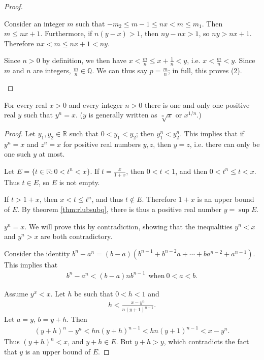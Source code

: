 \documentclass[12pt]{article}
\begin{document}
\begin{thm}
\begin{proof}
\begin{enumerate}
        Consider an integer $m$ such that $-m_2 \leq m - 1 \leq nx < m \leq m_1$.
        Then $m \leq nx + 1$. Furthermore, if $n(y - x) > 1$, then $ny - nx > 1$, so
        $ny > nx + 1$. Therefore $nx < m \leq nx + 1 < ny$.

        Since $n > 0$ by definition, we then have $x < \frac{m}{n} \leq x +
        \frac{1}{n} < y$, i.e. $x < \frac{m}{n} < y$. Since $m$ and $n$ are integers,
        $\frac{m}{n} \in \mathbb{Q}$. We can thus say $p = \frac{m}{n}$; in full,
        this proves (2).
    \end{enumerate}
  \end{proof}
\end{thm}

\begin{thm} \label{thm:uniqrealroots}
  For every real $x > 0$ and every integer $n > 0$ there is one and only one positive
  real $y$ such that $y^n = x$. ($y$ is generally written as $\sqrt[n]{x}$ or
  $x^{1/n}$.)

  \begin{proof}
    Let $y_1,y_2 \in \mathbb{R}$ such that $0 < y_1 < y_2$; then $y_1^n < y_2^n$.
    This implies that if $y^n = x$ and $z^n = x$ for positive real numbers $y,z$,
    then $y = z$, i.e. there can only be one such $y$ at most.

    Let $E = \{t \in \mathbb{R}: 0 < t^n < x\}$. If $t = \frac{x}{1 + x}$, then $0
    < t < 1$, and then $0 < t^n \leq t < x$. Thus $t \in E$, so $E$ is not empty.

    If $t > 1 + x$, then $x < t \leq t^n$, and thus $t \notin E$. Therefore $1 + x$
    is an upper bound of $E$. By theorem \ref{thm:rlubsubq}, there is thus a positive
    real number $y = \sup E$.

    $y^n = x$. We will prove this by contradiction, showing that the inequalities
    $y^n < x$ and $y^n > x$ are both contradictory.

    Consider the identity $b^n - a^n = (b - a)(b^{n - 1} + b^{n - 2}a + \cdots +
    ba^{n - 2} + a^{n - 1})$. This implies that
    \begin{align*}
      b^n - a^n < (b - a)nb^{n-1}\ \ \text{when}\ 0 < a < b.
    \end{align*}

    Assume $y^x < x$. Let $h$ be such that $0 < h < 1$ and
    \begin{align*}
      h < \frac{x - y^n}{n(y + 1)^{n-1}}.
    \end{align*}
    Let $a = y$, $b = y + h$. Then
    \begin{align*}
      (y + h)^n - y^n < hn(y + h)^{n - 1} < hn(y + 1)^{n - 1} < x - y^n.
    \end{align*}
    Thus $(y + h)^n < x$, and $y + h \in E$. But $y + h > y$, which contradicts the
    fact that $y$ is an upper bound of $E$.


\end{proof}
\end{thm}
\end{document}
